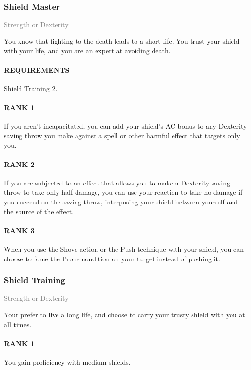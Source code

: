 \subsubsection{Shield Master} \label{feat::shieldmaster}
\small{\textcolor{gray}{Strength or Dexterity}}

\normalsize
You know that fighting to the death leads to a short life.
You trust your shield with your life, and you are an expert at avoiding death.
\paragraph{REQUIREMENTS} Shield Training 2.
\paragraph{RANK 1} If you aren't incapacitated, you can add your shield's AC bonus to any Dexterity saving throw you make against a spell or other harmful effect that targets only you.
\paragraph{RANK 2} If you are subjected to an effect that allows you to make a Dexterity saving throw to take only half damage, you can use your reaction to take no damage if you succeed on the saving throw, interposing your shield between yourself and the source of the effect.
\paragraph{RANK 3} When you use the Shove action or the Push technique with your shield, you can choose to force the Prone condition on your target instead of pushing it.

\subsubsection{Shield Training} \label{feat::shieldtraining}
\small{\textcolor{gray}{Strength or Dexterity}}

\normalsize
Your prefer to live a long life, and choose to carry your trusty shield with you at all times.
\paragraph{RANK 1} You gain proficiency with medium shields.
